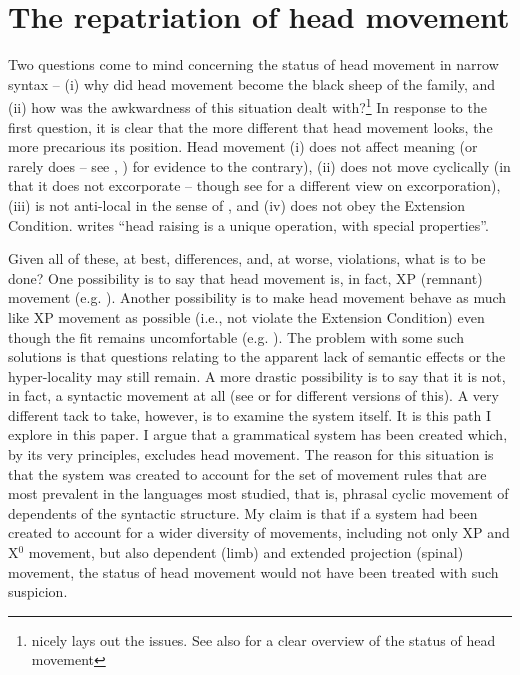 \documentclass[output=paper,colorlinks,citecolor=brown,
]{langscibook}
\begin{document}
\section{The repatriation of head movement}

Two questions come to mind concerning the status of head movement in narrow syntax -- (i) why did head movement become the black sheep of the family, and (ii) how was the awkwardness of this situation dealt with?\footnote{\citet{Roberts:2010} nicely lays out the issues. See also \citet{Dekany:2018} for a clear overview of the status of head movement}   In response to the first question, it is clear that the more different that head movement looks, the more precarious its position.  Head movement (i) does not affect meaning (or rarely does -- see \citet{Lechner:2006}, \citealt[Ch. 1]{Roberts:2010}) for evidence to the contrary), (ii) does not move cyclically (in that it does not excorporate -- though see \citet{Roberts:2010} for a different view on excorporation), (iii) is not anti-local in the sense of \citet{Grohmann:2003b}, and (iv)  does not obey the Extension Condition.  \citet[12]{Chomsky:2015} writes “head raising is a unique operation, with special properties”. 

Given all of these, at best, differences, and, at worse, violations, what is to be done?  One possibility is to say that head movement is, in fact, XP (remnant) movement (e.g. \citealt{Koopman:2000}).  Another possibility is to make head movement behave as much like XP movement as possible (i.e., not violate the Extension Condition) even though the fit remains uncomfortable (e.g. \citealt{Matushansky:2006}).  The problem with some such solutions is that questions relating to the apparent lack of semantic effects or the hyper-locality  may still remain.  A more drastic possibility is to say that it is not, in fact, a syntactic movement at all (see \citet{Chomsky:2001a} or \citet{Harley:2003a} for different versions of this).  A very different tack to take, however, is to examine the system itself.   It is this path I explore in this paper.  I argue that a grammatical system has been created which, by its very principles, excludes head movement.  The reason for this situation is that the system was created to account for the set of movement rules that are most prevalent in the languages most studied, that is, phrasal cyclic movement of dependents of the syntactic structure.  My claim is that if a system had been created to account for a wider diversity of movements, including not only XP and X$^0$ movement, but also dependent (limb)  and extended projection (spinal) movement, the status of head movement would not have been treated with such suspicion. 
\end{document}
